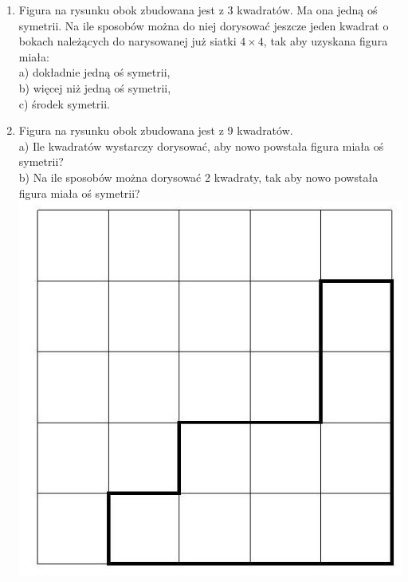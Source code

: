 \documentclass[10pt]{article}
\begin{document}
\begin{enumerate}
  \item Figura na rysunku obok zbudowana jest z 3 kwadratów. Ma ona jedną oś symetrii. Na ile sposobów można do niej dorysować jeszcze jeden kwadrat o bokach należących do narysowanej już siatki \(4 \times 4\), tak aby uzyskana figura miała:\\
a) dokładnie jedną oś symetrii,\\
b) więcej niż jedną oś symetrii,\\
c) środek symetrii.
  \item Figura na rysunku obok zbudowana jest z 9 kwadratów.\\
a) Ile kwadratów wystarczy dorysować, aby nowo powstała figura miała oś symetrii?\\
b) Na ile sposobów można dorysować 2 kwadraty, tak aby nowo powstała figura miała oś symetrii?\\
\includegraphics[max width=\textwidth, center]{2024_11_21_e9b4faa005d5be2cc318g-154(1)}\\

\end{enumerate}
\end{document}
